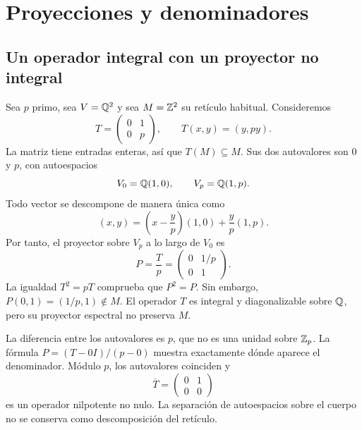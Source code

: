 \section{Proyecciones y denominadores}
\label{sec:proyecciones}


\subsection{Un operador integral con un proyector no integral}

Sea $p$ primo, sea $V=\mathbb{Q}^2$ y sea $M=\mathbb{Z}^2$ su retículo habitual.
Consideremos
\begin{equation}
 T=\begin{pmatrix}0&1\\0&p\end{pmatrix},
 \qquad T(x,y)=(y,py).
 \label{eq:operador-t}
\end{equation}
La matriz tiene entradas enteras, así que $T(M)\subseteq M$. Sus dos
autovalores son $0$ y $p$, con autoespacios
\[
 V_0=\mathbb{Q}(1,0),\qquad V_p=\mathbb{Q}(1,p).
\]
Todo vector se descompone de manera única como
\begin{equation}
 (x,y)=\left(x-\frac yp\right)(1,0)+\frac yp(1,p).
 \label{eq:descomposicion}
\end{equation}
Por tanto, el proyector sobre $V_p$ a lo largo de $V_0$ es
\begin{equation}
 P=\frac{T}{p}
   =\begin{pmatrix}0&1/p\\0&1\end{pmatrix}.
 \label{eq:proyector-p}
\end{equation}
La igualdad $T^2=pT$ comprueba que $P^2=P$. Sin embargo,
$P(0,1)=(1/p,1)\notin M$. El operador $T$ es integral y diagonalizable
sobre $\mathbb{Q}$, pero su proyector espectral no preserva $M$.

La diferencia entre los autovalores es $p$, que no es una unidad sobre
$\mathbb{Z}_p$. La fórmula $P=(T-0I)/(p-0)$ muestra exactamente dónde aparece
el denominador. Módulo $p$, los autovalores coinciden y
\[
 \overline T=\begin{pmatrix}0&1\\0&0\end{pmatrix}
\]
es un operador nilpotente no nulo. La separación de autoespacios sobre
el cuerpo no se conserva como descomposición del retículo.

